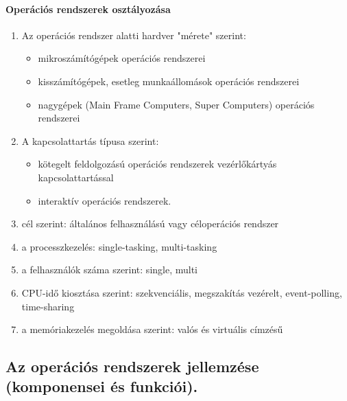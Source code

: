 \paragraph{Operációs rendszerek osztályozása}
	\begin{enumerate}[nosep]
	\item Az operációs rendszer alatti hardver "mérete" szerint:
		\begin{itemize}[nosep]
		\item mikroszámítógépek operációs rendszerei
		\item kisszámítógépek, esetleg munkaállomások operációs rendszerei
		\item nagygépek (Main Frame Computers, Super Computers) operációs rendszerei
		\end{itemize}
	\item A kapcsolattartás típusa szerint:
		\begin{itemize}[nosep]
		\item kötegelt feldolgozású operációs rendszerek vezérlőkártyás kapcsolattartással
		\item interaktív operációs rendszerek.
		\end{itemize}
	\item cél szerint: általános felhasználású vagy céloperációs rendszer
	\item a processzkezelés: single-tasking, multi-tasking
	\item a felhasználók száma szerint: single, multi
	\item CPU-idő kiosztása szerint: szekvenciális, megszakítás vezérelt, event-polling, time-sharing
	\item a memóriakezelés megoldása szerint: valós és virtuális címzésű
	\end{enumerate}

\subsection{Az operációs rendszerek jellemzése (komponensei és funkciói).}
